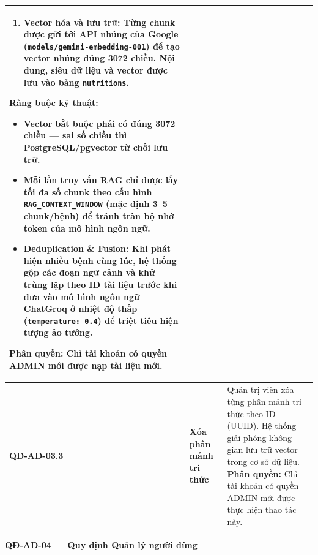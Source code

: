\documentclass[12pt,a4paper]{article}
\begin{document}
\begin{longtable}{|
        >{\raggedright\arraybackslash}p{2.2cm}|
        >{\raggedright\arraybackslash}p{2.8cm}|
        >{\raggedright\arraybackslash}p{9.8cm}|}
\begin{enumerate}[leftmargin=*,topsep=2pt,itemsep=1pt]
        \item \textbf{Vector hóa và lưu trữ:} Từng chunk được gửi tới API nhúng của Google (\texttt{models/gemini-embedding-001}) để tạo vector nhúng đúng \textbf{3072 chiều}. Nội dung, siêu dữ liệu và vector được lưu vào bảng \texttt{nutritions}.
    \end{enumerate}
    \textbf{Ràng buộc kỹ thuật:}
    \begin{itemize}[leftmargin=*,topsep=2pt,itemsep=1pt]
        \item Vector bắt buộc phải có đúng \textbf{3072 chiều} --- sai số chiều thì PostgreSQL/pgvector từ chối lưu trữ.
        \item Mỗi lần truy vấn RAG chỉ được lấy tối đa số chunk theo cấu hình \texttt{RAG\_CONTEXT\_WINDOW} (mặc định 3--5 chunk/bệnh) để tránh tràn bộ nhớ token của mô hình ngôn ngữ.
        \item \textbf{Deduplication \& Fusion:} Khi phát hiện nhiều bệnh cùng lúc, hệ thống gộp các đoạn ngữ cảnh và khử trùng lặp theo ID tài liệu trước khi đưa vào mô hình ngôn ngữ ChatGroq ở nhiệt độ thấp (\texttt{temperature: 0.4}) để triệt tiêu hiện tượng ảo tưởng.
    \end{itemize}
    \textbf{Phân quyền:} Chỉ tài khoản có quyền ADMIN mới được nạp tài liệu mới.                                                              \\
    \hline
    \textbf{QĐ-AD-03.3}  & \textbf{Xóa phân mảnh tri thức}      &
    Quản trị viên xóa từng phân mảnh tri thức theo ID (UUID). Hệ thống giải phóng không gian lưu trữ vector trong cơ sở dữ liệu. \newline
    \textbf{Phân quyền:} Chỉ tài khoản có quyền ADMIN mới được thực hiện thao tác này.                                                        \\
    \hline
\end{longtable}

\vspace{0.3cm}
\noindent\textbf{QĐ-AD-04 --- Quy định Quản lý người dùng}
\end{document}
